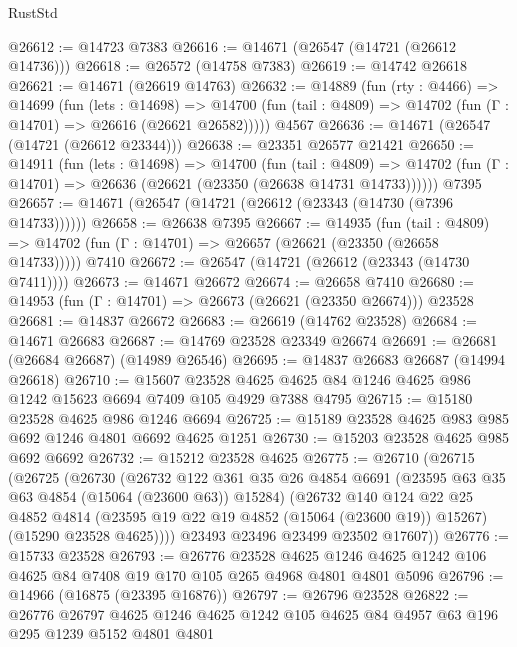 \begin{lexlean}{RustStd}
\begin{coremodule}
@26612 := @14723 @7383
@26616 := @14671 (@26547 (@14721 (@26612 @14736)))
@26618 := @26572 (@14758 @7383)
@26619 := @14742 @26618
@26621 := @14671 (@26619 @14763)
@26632 := @14889
    (fun (rty : @4466) =>
    @14699
      (fun (lets : @14698) =>
      @14700 (fun (tail : @4809) => @14702 (fun (Γ : @14701) => @26616 (@26621 @26582)))))
    @4567
@26636 := @14671 (@26547 (@14721 (@26612 @23344)))
@26638 := @23351 @26577 @21421
@26650 := @14911
    (fun (lets : @14698) =>
    @14700
      (fun (tail : @4809) =>
      @14702 (fun (Γ : @14701) => @26636 (@26621 (@23350 (@26638 @14731 @14733))))))
    @7395
@26657 := @14671 (@26547 (@14721 (@26612 (@23343 (@14730 (@7396 @14733))))))
@26658 := @26638 @7395
@26667 := @14935
    (fun (tail : @4809) => @14702 (fun (Γ : @14701) => @26657 (@26621 (@23350 (@26658 @14733)))))
    @7410
@26672 := @26547 (@14721 (@26612 (@23343 (@14730 @7411))))
@26673 := @14671 @26672
@26674 := @26658 @7410
@26680 := @14953 (fun (Γ : @14701) => @26673 (@26621 (@23350 @26674))) @23528
@26681 := @14837 @26672
@26683 := @26619 (@14762 @23528)
@26684 := @14671 @26683
@26687 := @14769 @23528 @23349 @26674
@26691 := @26681 (@26684 @26687) (@14989 @26546)
@26695 := @14837 @26683 @26687 (@14994 @26618)
@26710 := @15607
    @23528
    @4625
    @4625
    @84
    @1246
    @4625
    @986
    @1242
    @15623
    @6694
    @7409
    @105
    @4929
    @7388
    @4795
@26715 := @15180 @23528 @4625 @986 @1246 @6694
@26725 := @15189 @23528 @4625 @983 @985 @692 @1246 @4801 @6692 @4625 @1251
@26730 := @15203 @23528 @4625 @985 @692 @6692
@26732 := @15212 @23528 @4625
@26775 := @26710
    (@26715
      (@26725
        (@26730
          (@26732
            @122
            @361
            @35
            @26
            @4854
            @6691
            (@23595 @63 @35 @63 @4854 (@15064 (@23600 @63)) @15284)
            (@26732
              @140
              @124
              @22
              @25
              @4852
              @4814
              (@23595 @19 @22 @19 @4852 (@15064 (@23600 @19)) @15267)
              (@15290 @23528 @4625))))
        @23493
        @23496
        @23499
        @23502
        @17607))
@26776 := @15733 @23528
@26793 := @26776
    @23528
    @4625
    @1246
    @4625
    @1242
    @106
    @4625
    @84
    @7408
    @19
    @170
    @105
    @265
    @4968
    @4801
    @4801
    @5096
@26796 := @14966 (@16875 (@23395 @16876))
@26797 := @26796 @23528
@26822 := @26776
    @26797
    @4625
    @1246
    @4625
    @1242
    @105
    @4625
    @84
    @4957
    @63
    @196
    @295
    @1239
    @5152
    @4801
    @4801

\end{coremodule}
\end{lexlean}
